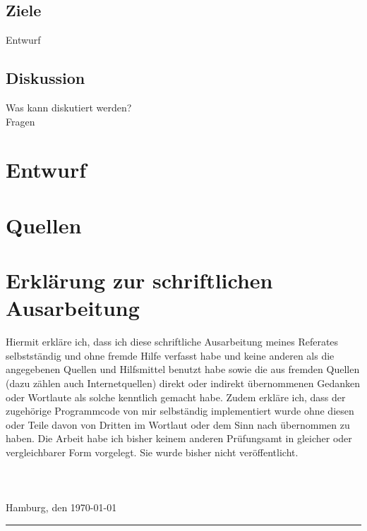 \documentclass[11pt]{article}
\begin{document}
    \subsection{Ziele}
    Entwurf

    \subsection{Diskussion}
    Was kann diskutiert werden?\\
    Fragen

    \section{Entwurf}

    \section{Quellen}
    
    

    \newpage

    \section{Erkl\"arung zur schriftlichen Ausarbeitung}

    Hiermit erkl\"are ich, dass ich diese schriftliche Ausarbeitung meines Referates selbstst\"andig und ohne fremde Hilfe verfasst habe und keine anderen als die angegebenen Quellen und Hilfsmittel benutzt habe sowie die aus fremden Quellen (dazu z\"ahlen auch Internetquellen) direkt oder indirekt \"ubernommenen Gedanken oder Wortlaute als solche kenntlich gemacht habe. Zudem erkl\"are ich, dass der zugeh\"orige Programmcode von mir selbst\"andig implementiert wurde ohne diesen oder Teile davon von Dritten im Wortlaut oder dem Sinn nach \"ubernommen zu haben. Die Arbeit habe ich bisher keinem anderen Pr\"ufungsamt in gleicher oder vergleichbarer Form vorgelegt. Sie wurde bisher nicht ver\"offentlicht.\\ \\ \\ \\
    Hamburg, den \today \indent\rule{8.5cm}{0.4pt}
\end{document}
